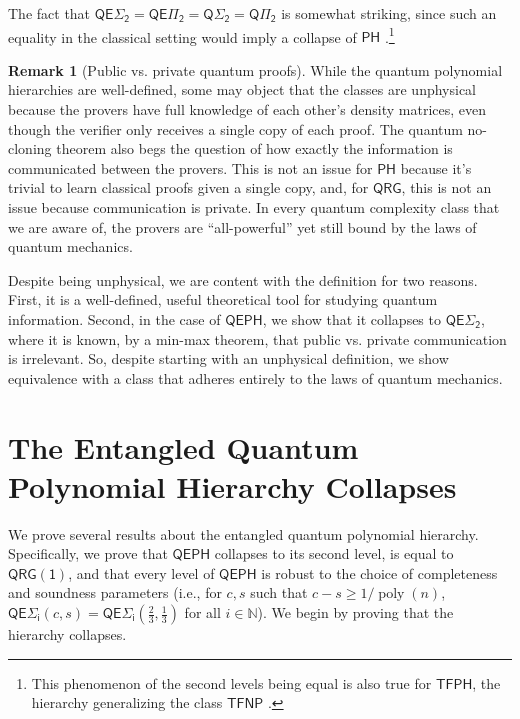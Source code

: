 \documentclass[10pt,a4paper]{article}
\theoremstyle{definition}
\newtheorem{remark}[theorem]{Remark}
\DeclareMathOperator{\poly}{poly}
\newcommand{\nats}{\mathbb N}
\newcommand{\N}{\nats}
\newcommand{\class}[1]{\ensuremath{\mathsf{#1}}\xspace}
\newcommand{\QRG}{\class{QRG}}
\newcommand{\QRGk}[1][k]{\class{QRG(#1)}}
\newcommand{\QRGone}{\QRGk[1]}
\newcommand{\PH}{\class{PH}}
\newcommand{\QSigmai}[1][i]{\class{Q\Sigma_{#1}}}
\newcommand{\QPii}[1][i]{\class{Q\Pi_{#1}}}
\newcommand{\QEPH}{\class{QEPH}}
\newcommand{\entQSigmai}[1][i]{\class{QE\Sigma_{#1}}}
\newcommand{\entQPii}[1][i]{\class{QE\Pi_{#1}}}
\begin{document}
The fact that $\entQSigmai[2] = \entQPii[2] = \QSigmai[2] = \QPii[2]$ is somewhat striking, since such an equality in the classical setting would imply a collapse of $\PH$ \cite[Theorem 5.6]{arora2009computational}.\footnote{This phenomenon of the second levels being equal is also true for $\mathsf{TFPH}$, the hierarchy generalizing the class $\mathsf{TFNP}$ \cite{kleinberg_et_al:LIPIcs.ITCS.2021.44}.} 

\begin{remark}[Public vs. private quantum proofs]\label{remark:public}
While the quantum polynomial hierarchies are well-defined, some may object that the classes are unphysical because the provers have full knowledge of each other's density matrices, 
even though the verifier only receives a single copy of each proof. 
The quantum no-cloning theorem also begs the question of how exactly the information is communicated between the provers. 
This is not an issue for $\PH$ because it's trivial to learn classical proofs given a single copy, and, for $\QRG$, this is not an issue because communication is private. 
In every quantum complexity class that we are aware of, the provers are ``all-powerful'' yet still bound by the laws of quantum mechanics.

Despite being unphysical, we are content with the definition for two reasons. First, it is a well-defined, useful theoretical tool for studying quantum information. 
Second, in the case of $\QEPH$, we show that it collapses to $\entQSigmai[2]$, where it is known, by a min-max theorem, that public vs. private communication is irrelevant. So, despite starting with an unphysical definition, we show equivalence with a class that adheres entirely to the laws of quantum mechanics. 
\end{remark}

\section{The Entangled Quantum Polynomial Hierarchy Collapses}\label{sec:entQPHcollapseInPSPACE}

We prove several results about the entangled quantum polynomial hierarchy. 
Specifically, we prove that $\QEPH$ collapses to its second level, is equal to $\QRGone$, and that every level of $\QEPH$ is robust to the choice of completeness and soundness parameters (i.e., for $c, s$ such that $c-s \geq 1/\poly(n)$, $\entQSigmai(c,s) = \entQSigmai(\frac{2}{3}, \frac{1}{3})$ for all $i \in \N$).
We begin by proving that the hierarchy collapses.
\end{document}
